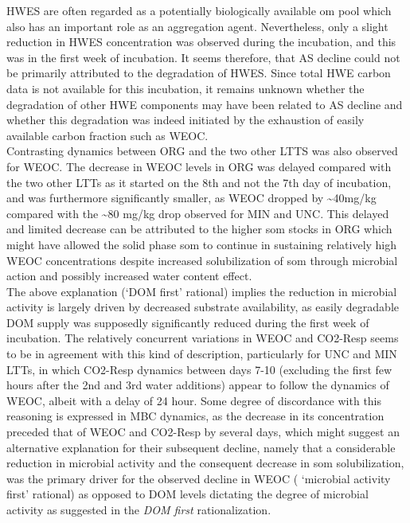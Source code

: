 	HWES are often regarded as a potentially biologically available \gls{om} pool which also has an important role as an aggregation agent. Nevertheless, only a slight reduction in HWES concentration was observed during the incubation, and this was in the first week of incubation. It seems therefore, that AS decline could not be primarily attributed to the degradation of HWES. Since total HWE carbon data is not available for this incubation, it remains unknown whether the degradation of other HWE components may have been related to AS decline and whether this degradation was indeed initiated by  the exhaustion of easily available carbon fraction such as WEOC.\\
	\hypertarget{weoc_decrease}{}
	Contrasting dynamics between ORG and the two other LTTS was also observed for WEOC. The decrease in WEOC levels in ORG was delayed compared with the two other LTTs as it started on the 8th and not the 7th day of incubation, and was furthermore significantly smaller, as WEOC dropped by \~{}40mg/kg compared with the \~{}80 mg/kg drop observed for MIN and UNC. This delayed and limited decrease can be attributed to the higher \gls{som} stocks in ORG which might have allowed the solid phase \gls{som} to continue in sustaining relatively high WEOC concentrations despite increased solubilization of \gls{som} through microbial action and possibly increased water content effect.\\
	The above explanation (‘DOM first’ rational) implies  the reduction in microbial activity is largely driven by decreased substrate availability, as easily degradable DOM supply was supposedly significantly reduced during the first week of incubation. The relatively concurrent variations in WEOC and CO2-Resp seems to be in agreement with this kind of description, particularly for UNC and MIN LTTs, in which CO2-Resp dynamics between days 7-10 (excluding the first few hours after the 2nd and 3rd water additions) appear to follow the dynamics of WEOC, albeit with a delay of 24 hour. Some  degree of discordance with this reasoning is expressed in MBC dynamics, as the decrease in its concentration preceded that of WEOC and  CO2-Resp by several days, which might suggest an alternative explanation for their subsequent decline, namely that a considerable reduction in microbial activity and the consequent decrease in \gls{som} solubilization, was the primary driver for the observed decline in WEOC ( ‘microbial activity first’ rational) as opposed to DOM levels dictating the degree of microbial activity as suggested in the \textit{DOM first} rationalization.\\
